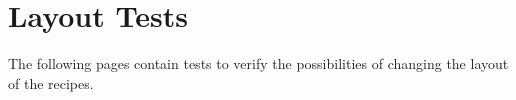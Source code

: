\documentclass[%
a4paper,
11pt
]{article}
\begin{document}




\section{Layout Tests}
The following pages contain tests to verify the possibilities of changing the layout of the recipes.












%
\end{document}
